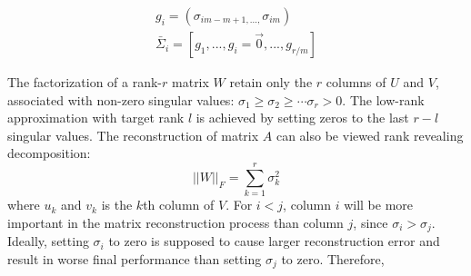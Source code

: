 \begin{align}
{g_i} = ({\sigma _{im - m + 1,...,}}{\sigma _{im}}) 
\label{equ:gi}\\
{{\bar \Sigma }_i} = [{g_1},...,{g_i} = \vec 0,...,{g_{r/m}}] \label{equ:sigmai}
\end{align}


The factorization of a rank-$r$ matrix $W$ retain only the $r$ columns of $U$ and $V$, associated with non-zero singular values: ${\sigma _1} \ge {\sigma _2} \ge  \cdots {\sigma _r} > 0$. 
The low-rank approximation with target rank $l$ is achieved by setting zeros to the  last $r-l$ singular values.
The reconstruction of matrix $A$ can also be viewed rank revealing decomposition:
\begin{equation}
    ||W||_F=\sum_{k=1}^r \sigma_k^2
    \label{equ:rank_decomposition}
\end{equation}
where $u_k$ and $v_k$ is the $k$th column of $V$.
For $i<j$, column $i$ will be more important in the matrix reconstruction process than column $j$, since ${\sigma_i > {\sigma_j}}$. 
Ideally, setting $\sigma_i$ to zero is supposed to cause larger reconstruction error and result in worse final performance than setting $\sigma_j$ to zero. 
Therefore, 